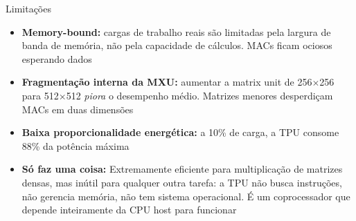 \documentclass[aspectratio=169]{beamer}
\begin{document}
\begin{frame}{Limitações}

\begin{itemize}
  \item {\justify \textbf{Memory-bound:} cargas de trabalho reais são limitadas pela largura de banda de memória, não pela capacidade de cálculos. MACs ficam ociosos esperando dados
  \cite{jouppi2017tpu}}
  
  \item {\justify \textbf{Fragmentação interna da MXU:}
  aumentar a matrix unit de 256$\times$256 para
  512$\times$512 \textit{piora} o desempenho médio. 
  Matrizes menores desperdiçam MACs em duas dimensões}

  \item { \justify \textbf{Baixa proporcionalidade energética:}
  a 10\% de carga, a TPU consome 88\% da potência
  máxima}

  \item{\justify \textbf{Só faz uma coisa:}
  Extremamente eficiente para multiplicação de matrizes densas, mas inútil para qualquer outra tarefa: a TPU não busca instruções, não gerencia memória, não tem sistema operacional. É um coprocessador que depende inteiramente da CPU host para funcionar}
\end{itemize}

\end{frame}
\end{document}
